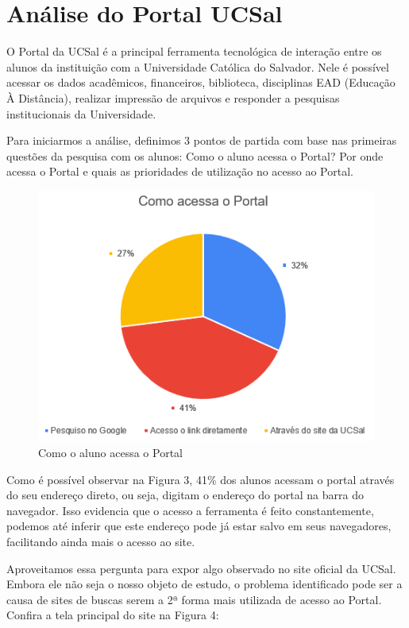 \documentclass[12pt]{article}
\begin{document}
\section{Análise do Portal UCSal\label{sec:analiseportal}}
O Portal da UCSal é a principal ferramenta tecnológica de interação entre os alunos da instituição com a Universidade Católica do Salvador. Nele é possível acessar os dados acadêmicos, financeiros, biblioteca, disciplinas EAD (Educação À Distância), realizar impressão de arquivos e responder a pesquisas institucionais da Universidade. 

Para iniciarmos a análise, definimos 3 pontos de partida com base nas primeiras questões da pesquisa com os alunos: Como o aluno acessa o Portal? Por onde acessa o Portal e quais as prioridades de utilização no acesso ao Portal.

\begin{figure}[!htb]
\centering
\includegraphics[scale=0.4,frame]{img3.png}
\caption{Como o aluno acessa o Portal}
\label{fig:grafico1}
\end{figure}

Como é possível observar na Figura 3, 41\% dos alunos acessam o portal através do seu endereço direto, ou seja, digitam o endereço do portal na barra do navegador. Isso evidencia que o acesso a ferramenta é feito constantemente, podemos até inferir que este endereço pode já estar salvo em seus navegadores, facilitando ainda mais o acesso ao site.

Aproveitamos essa pergunta para expor algo observado no site oficial da UCSal. Embora ele não seja o nosso objeto de estudo, o problema identificado pode ser a causa de sites de buscas serem a 2ª forma mais utilizada de acesso ao Portal.  Confira a tela principal do site na Figura 4: 
\end{document}
